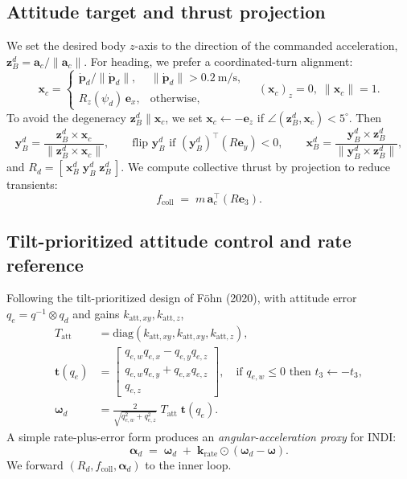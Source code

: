 \subsection{Attitude target and thrust projection}\label{sec:outer-att}
We set the desired body $z$-axis to the direction of the commanded acceleration,
$\mathbf{z}_B^d=\mathbf{a}_c/\|\mathbf{a}_c\|$.
For heading, we prefer a coordinated-turn alignment:
\[
\mathbf{x}_c =
\begin{cases}
\dot{\mathbf{p}}_d/\|\dot{\mathbf{p}}_d\|, & \|\dot{\mathbf{p}}_d\|>0.2~\mathrm{m/s},\\
R_z(\psi_d)\,\mathbf{e}_x, & \text{otherwise},
\end{cases}
\quad (\mathbf{x}_c)_z=0,\;\|\mathbf{x}_c\|=1.
\]
To avoid the degeneracy $\mathbf{z}_B^d\parallel\mathbf{x}_c$, we set
$\mathbf{x}_c\leftarrow -\mathbf{e}_z$ if $\angle(\mathbf{z}_B^d,\mathbf{x}_c)<5^\circ$.
Then
\begin{equation}
\mathbf{y}_B^d = \frac{\mathbf{z}_B^d\times\mathbf{x}_c}{\|\mathbf{z}_B^d\times\mathbf{x}_c\|},
\qquad
\text{flip } \mathbf{y}_B^d \text{ if } (\mathbf{y}_B^d)^\top(R\mathbf{e}_y)<0,
\qquad
\mathbf{x}_B^d = \frac{\mathbf{y}_B^d\times\mathbf{z}_B^d}{\|\mathbf{y}_B^d\times\mathbf{z}_B^d\|},
\end{equation}
and $R_d=[\,\mathbf{x}_B^d\;\mathbf{y}_B^d\;\mathbf{z}_B^d\,]$.
We compute collective thrust by projection to reduce transients:
\begin{equation}
f_{\text{coll}} \;=\; m\,\mathbf{a}_c^\top (R\mathbf{e}_3).
\label{eq:thrust-proj}
\end{equation}

\subsection{Tilt-prioritized attitude control and rate reference}\label{sec:tilt-prio}
Following the tilt-prioritized design of Föhn (2020), with attitude error
$q_e=q^{-1}\!\otimes q_d$ and gains $k_{\text{att},xy},k_{\text{att},z}$,
\begin{align}
T_{\text{att}} &= \mathrm{diag}(k_{\text{att},xy},k_{\text{att},xy},k_{\text{att},z}),
\\
\mathbf{t}(q_e) &= 
\begin{bmatrix}
q_{e,w}q_{e,x}-q_{e,y}q_{e,z}\\
q_{e,w}q_{e,y}+q_{e,x}q_{e,z}\\
q_{e,z}
\end{bmatrix},
\quad \text{if } q_{e,w}\le 0 \text{ then } t_3\leftarrow -t_3,
\\
\boldsymbol{\omega}_d &= \frac{2}{\sqrt{q_{e,w}^2+q_{e,z}^2}}\;T_{\text{att}}\;\mathbf{t}(q_e).
\label{eq:omega-d}
\end{align}
A simple rate-plus-error form produces an \emph{angular-acceleration proxy}
for INDI:
\begin{equation}
\boldsymbol{\alpha}_d \;=\; \boldsymbol{\omega}_d \;+\; 
\mathbf{k}_{\text{rate}}\odot(\boldsymbol{\omega}_d-\boldsymbol{\omega}).
\label{eq:alpha-d}
\end{equation}
We forward $(R_d,f_{\text{coll}},\boldsymbol{\alpha}_d)$ to the inner loop.

